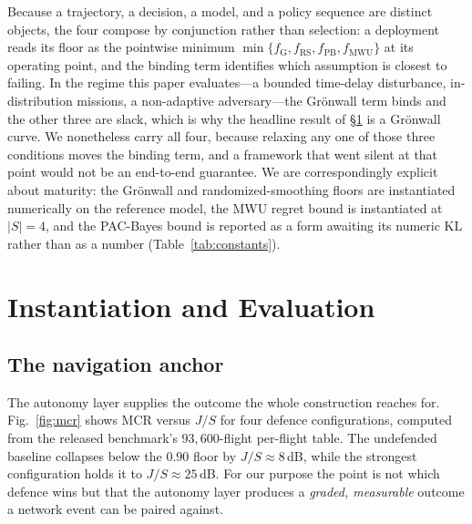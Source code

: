 Because a trajectory, a decision, a model, and a policy sequence are distinct
objects, the four compose by conjunction rather than selection: a deployment
reads its floor as the pointwise minimum
$\min\{f_{\mathrm{G}},f_{\mathrm{RS}},f_{\mathrm{PB}},f_{\mathrm{MWU}}\}$ at its
operating point, and the binding term identifies which assumption is closest to
failing. In the regime this paper evaluates---a bounded time-delay disturbance,
in-distribution missions, a non-adaptive adversary---the Gr\"onwall term binds
and the other three are slack, which is why the headline result of
\S\ref{sec:eval} is a Gr\"onwall curve. We nonetheless carry all four, because
relaxing any one of those three conditions moves the binding term, and a
framework that went silent at that point would not be an end-to-end guarantee.
We are correspondingly explicit about maturity: the Gr\"onwall and
randomized-smoothing floors are instantiated numerically on the reference model,
the MWU regret bound is instantiated at $|S|=4$, and the PAC-Bayes bound is
reported as a form awaiting its numeric $\mathrm{KL}$ rather than as a number
(Table~\ref{tab:constants}).

\section{Instantiation and Evaluation}
\label{sec:eval}
\subsection{The navigation anchor}
The autonomy layer supplies the outcome the whole construction reaches for.
Fig.~\ref{fig:mcr} shows MCR versus $J/S$ for four defence configurations,
computed from the released benchmark's $93{,}600$-flight per-flight table. The
undefended baseline collapses below the $0.90$ floor by $J/S\!\approx\!8$\,dB,
while the strongest configuration holds it to $J/S\!\approx\!25$\,dB. For our
purpose the point is not which defence wins but that the autonomy layer produces
a \emph{graded, measurable} outcome a network event can be paired against.

